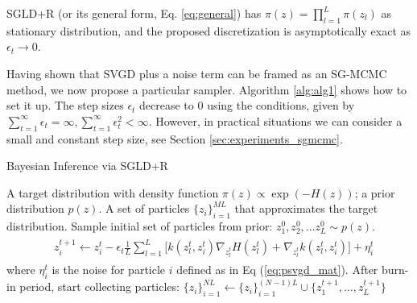 \begin{proposition}
SGLD+R (or its general form, Eq. \eqref{eq:general}) has $\pi({z}) = \prod_{l=1}^L \pi({z}_l)$ as stationary distribution, and the proposed discretization is asymptotically exact as $\epsilon_t \rightarrow 0$.
\end{proposition}
\noindent Having shown that SVGD plus a noise term can be framed as an SG-MCMC method, we now propose a particular sampler. 
Algorithm \ref{alg:alg1} shows how to set it up. The step sizes $\epsilon_t$ decrease to $0$ using the \textcite{robbins} conditions, given by $\sum_{t=1}^\infty \epsilon_t = \infty, \sum_{t=1}^\infty \epsilon_t^2 < \infty$. However, in practical situations we can consider a small and constant step size, see Section \ref{sec:experiments_sgmcmc}. 

\begin{algorithm}[!h] %
\caption{Bayesian Inference via SGLD+R}  
\label{alg:alg1}
\begin{algorithmic}[1]
 A target distribution with density function $\pi({z}) \propto \exp (-H({z}))$; a prior distribution $p({z})$. 
 A set of particles $\{{z}_i\}_{i=1}^{ML}$ that approximates the target distribution.  
\State Sample initial set of particles from prior: ${z}_1^0, {z}_2^0, \ldots {z}_L^0 \sim p({z})$.
\State 
\begin{align} \label{eq:psvgd_alg}
\begin{split}
&{z}_i^{t+1}  \gets  {z}_i^t  - \epsilon_t \frac{1}{L}\sum_{l=1}^L\big[  k({z}_l^t, {z}_i^t)  \nabla_{{z}_l^t} H({z}_l^t) + \nabla_{{z}_l^t} k({z}_l^t, {z}_i^t)\big] + {\eta}_i^t
\end{split}
\end{align}
\State where ${\eta}_i^t$ is the noise for particle $i$ defined as in Eq (\ref{eq:psvgd_mat}).
\State After  burn-in period, start collecting particles: $ \{{z}_i\}_{i=1}^{NL} \gets \{{z}_i\}_{i=1}^{(N-1)L} \cup \{ {z}_1^{t+1}, \ldots,  {z}_L^{t+1} \} $ 
\EndFor
\end{algorithmic}
\end{algorithm}

